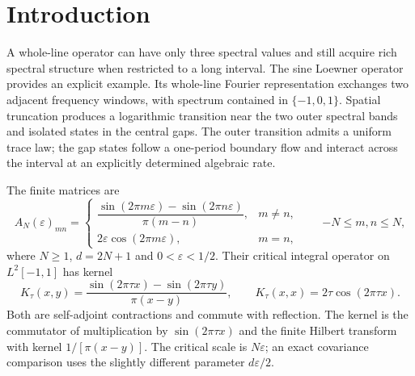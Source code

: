 \section{Introduction}
A whole-line operator can have only three spectral values and still acquire
rich spectral structure when restricted to a long interval. The sine
Loewner operator provides an explicit example. Its whole-line Fourier
representation exchanges two adjacent frequency windows, with spectrum
contained in $\{-1,0,1\}$. Spatial truncation produces a logarithmic
transition near the two outer spectral bands and isolated states in the
central gaps. The outer transition admits a uniform trace law; the gap
states follow a one-period boundary flow and interact across the interval
at an explicitly determined algebraic rate.

The finite matrices are
\begin{equation}\label{eq:2.1}
 A_N(\varepsilon)_{mn}=
 \begin{cases}
 \dfrac{\sin(2\pi m\varepsilon)-\sin(2\pi n\varepsilon)}{\pi(m-n)},&m\ne n,\\[1ex]
 2\varepsilon\cos(2\pi m\varepsilon),&m=n,
 \end{cases}\qquad {-N}\le m,n\le N,
\end{equation}
where $N\ge1$, $d=2N+1$ and $0<\varepsilon<1/2$. Their critical
integral operator on $L^2[-1,1]$ has kernel
\begin{equation}\label{eq:2.3}
 K_\tau(x,y)=\frac{\sin(2\pi\tau x)-\sin(2\pi\tau y)}{\pi(x-y)},
 \qquad K_\tau(x,x)=2\tau\cos(2\pi\tau x).
\end{equation}
Both are self-adjoint contractions and commute with reflection.
The kernel is the commutator of multiplication by $\sin(2\pi\tau x)$
and the finite Hilbert transform with kernel $1/[\pi(x-y)]$.
The critical scale is $N\varepsilon$; an exact covariance comparison
uses the slightly different parameter $d\varepsilon/2$.

